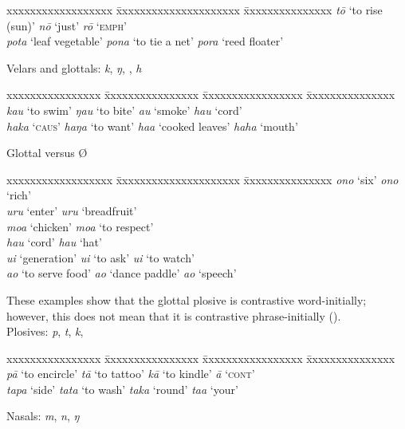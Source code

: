 \ea
\begin{tabbing}
 xxxxxxxxxxxxxxxxxx \= xxxxxxxxxxxxxxxxxxxxx \= xxxxxxxxxxxxxxx \kill
\textit{tō} ‘to rise (sun)’  \> \textit{nō} ‘just’  \> \textit{rō} ‘\textsc{emph}’\\
\textit{pota} ‘leaf vegetable’  \> \textit{pona} ‘to tie a net’  \> \textit{pora} ‘reed floater’
\end{tabbing}
\z
Velars and glottals: \textit{k}, \textit{ŋ}, \textit{{\ꞌ}}, \textit{h}

\ea
\begin{tabbing}
 xxxxxxxxxxxxxxxx \= xxxxxxxxxxxxxxxx \= xxxxxxxxxxxxxxxxx \= xxxxxxxxxxxxxxx \kill
 \textit{kau} ‘to swim’  \> \textit{ŋau} ‘to bite’  \> \textit{{\ꞌ}au} ‘smoke’  \> \textit{hau} ‘cord’\\
 \textit{haka} ‘\textsc{caus}’  \> \textit{haŋa} ‘to want’   \> \textit{ha{\ꞌ}a} ‘cooked leaves’  \> \textit{haha} ‘mouth’
\end{tabbing}
\z 
Glottal versus Ø

\ea
\begin{tabbing}
 xxxxxxxxxxxxxxxxxx \= xxxxxxxxxxxxxxxxxxxxx \= xxxxxxxxxxxxxxx \kill
 \textit{ono} ‘six’  \> \textit{{\ꞌ}ono} ‘rich’\\
 \textit{uru} ‘enter’  \> \textit{{\ꞌ}uru} ‘breadfruit’\\
 \textit{moa} ‘chicken’  \> \textit{mo{\ꞌ}a} ‘to respect’\\
 \textit{hau} ‘cord’  \> \textit{ha{\ꞌ}u} ‘hat’\\
 \textit{ui} ‘generation’  \> \textit{{\ꞌ}ui} ‘to ask’  \> \textit{u{\ꞌ}i} ‘to watch’\\
 \textit{ao} ‘to serve food’  \> \textit{{\ꞌ}ao} ‘dance paddle’  \> \textit{a{\ꞌ}o} ‘speech’
\end{tabbing}
\z 
These examples show that the glottal plosive is contrastive word-initially; however, this does not mean that it is contrastive phrase-initially ().
\\

Plosives: \textit{p}, \textit{t}, \textit{k}, \textit{{\ꞌ}}

\ea
\begin{tabbing}
 xxxxxxxxxxxxxxxx \= xxxxxxxxxxxxxxxx \= xxxxxxxxxxxxxxxxx \= xxxxxxxxxxxxxxx \kill
\textit{pā} ‘to encircle’\>   \textit{tā} ‘to tattoo’  \> \textit{kā} ‘to kindle’ \>  \textit{{\ꞌ}ā} ‘\textsc{cont}’\\
\textit{tapa} ‘side’  \> \textit{tata} ‘to wash’  \> \textit{taka} ‘round’  \> \textit{ta{\ꞌ}a} ‘your’
\end{tabbing}
\z
Nasals: \textit{m}, \textit{n}, \textit{ŋ}

